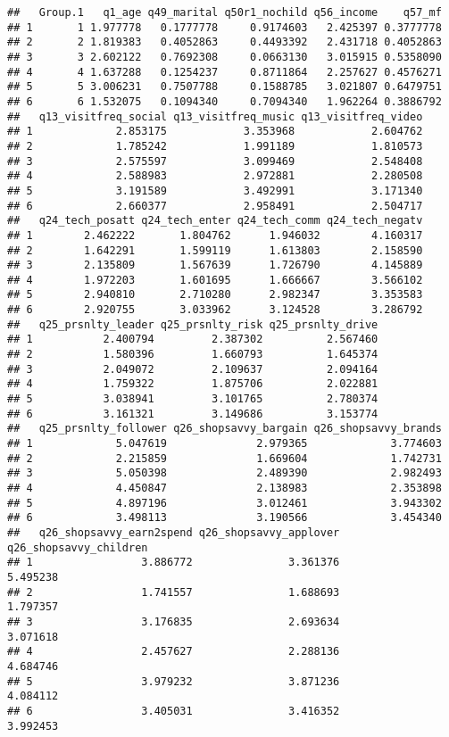 \documentclass[]{article}
\begin{document}
\begin{verbatim}
##   Group.1   q1_age q49_marital q50r1_nochild q56_income    q57_mf
## 1       1 1.977778   0.1777778     0.9174603   2.425397 0.3777778
## 2       2 1.819383   0.4052863     0.4493392   2.431718 0.4052863
## 3       3 2.602122   0.7692308     0.0663130   3.015915 0.5358090
## 4       4 1.637288   0.1254237     0.8711864   2.257627 0.4576271
## 5       5 3.006231   0.7507788     0.1588785   3.021807 0.6479751
## 6       6 1.532075   0.1094340     0.7094340   1.962264 0.3886792
##   q13_visitfreq_social q13_visitfreq_music q13_visitfreq_video
## 1             2.853175            3.353968            2.604762
## 2             1.785242            1.991189            1.810573
## 3             2.575597            3.099469            2.548408
## 4             2.588983            2.972881            2.280508
## 5             3.191589            3.492991            3.171340
## 6             2.660377            2.958491            2.504717
##   q24_tech_posatt q24_tech_enter q24_tech_comm q24_tech_negatv
## 1        2.462222       1.804762      1.946032        4.160317
## 2        1.642291       1.599119      1.613803        2.158590
## 3        2.135809       1.567639      1.726790        4.145889
## 4        1.972203       1.601695      1.666667        3.566102
## 5        2.940810       2.710280      2.982347        3.353583
## 6        2.920755       3.033962      3.124528        3.286792
##   q25_prsnlty_leader q25_prsnlty_risk q25_prsnlty_drive
## 1           2.400794         2.387302          2.567460
## 2           1.580396         1.660793          1.645374
## 3           2.049072         2.109637          2.094164
## 4           1.759322         1.875706          2.022881
## 5           3.038941         3.101765          2.780374
## 6           3.161321         3.149686          3.153774
##   q25_prsnlty_follower q26_shopsavvy_bargain q26_shopsavvy_brands
## 1             5.047619              2.979365             3.774603
## 2             2.215859              1.669604             1.742731
## 3             5.050398              2.489390             2.982493
## 4             4.450847              2.138983             2.353898
## 5             4.897196              3.012461             3.943302
## 6             3.498113              3.190566             3.454340
##   q26_shopsavvy_earn2spend q26_shopsavvy_applover q26_shopsavvy_children
## 1                 3.886772               3.361376               5.495238
## 2                 1.741557               1.688693               1.797357
## 3                 3.176835               2.693634               3.071618
## 4                 2.457627               2.288136               4.684746
## 5                 3.979232               3.871236               4.084112
## 6                 3.405031               3.416352               3.992453
\end{verbatim}
\end{document}
